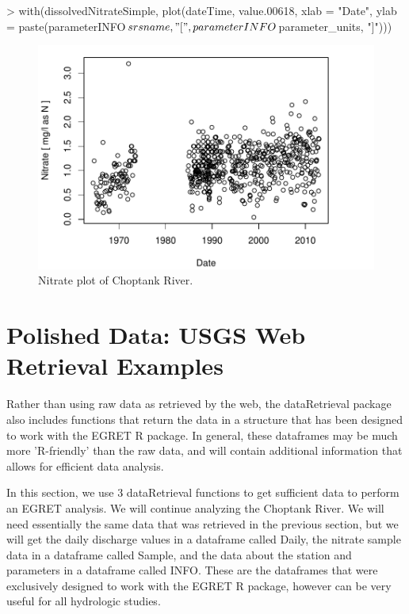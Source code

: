 \documentclass[a4paper,11pt]{article}
\begin{document}
\begin{Schunk}
\begin{Sinput}
> with(dissolvedNitrateSimple, plot(dateTime, value.00618, xlab = "Date", 
     ylab = paste(parameterINFO$srsname, "[", parameterINFO$parameter_units, 
         "]")))
\end{Sinput}
\end{Schunk}
\newpage

\begin{figure}
\begin{center}
\includegraphics{dataRetrieval-fig3}
\end{center}
\caption{Nitrate plot of Choptank River.}
\end{figure}



\section{Polished Data: USGS Web Retrieval Examples}
Rather than using raw data as retrieved by the web, the dataRetrieval package also includes functions that return the data in a structure that has been designed to work with the EGRET R package. In general, these dataframes may be much more 'R-friendly' than the raw data, and will contain additional information that allows for efficient data analysis.

In this section, we use 3 dataRetrieval functions to get sufficient data to perform an EGRET analysis.  We will continue analyzing the Choptank River. We will need essentially the same data that was retrieved in the previous section, but we will get the daily discharge values in a dataframe called Daily, the nitrate sample data in a dataframe called Sample, and the data about the station and parameters in a dataframe called INFO. These are the dataframes that were exclusively designed to work with the EGRET R package, however can be very useful for all hydrologic studies.
\end{document}
